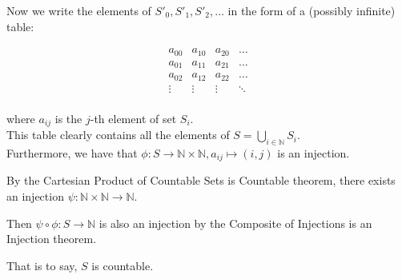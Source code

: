 \documentclass[12pt]{article}
\begin{document}
Now we write the elements of \( S'_0, S'_1, S'_2, \ldots \) in the form of a (possibly infinite) table:

\[
\begin{array}{cccccc}
a_{00} & a_{10} & a_{20} & \ldots \\
a_{01} & a_{11} & a_{21} & \ldots \\
a_{02} & a_{12} & a_{22} & \ldots \\
\vdots & \vdots & \vdots & \ddots \\
\end{array}
\]

where \( a_{ij} \) is the \( j \)-th element of set \( S_i \).\\

This table clearly contains all the elements of \( S = \bigcup_{i \in \mathbb{N}} S_i \).\\

Furthermore, we have that \( \phi: S \to \mathbb{N} \times \mathbb{N}, a_{ij} \mapsto (i, j) \) is an injection.

By the Cartesian Product of Countable Sets is Countable theorem, there exists an injection \( \psi: \mathbb{N} \times \mathbb{N} \to \mathbb{N} \).

Then \( \psi \circ \phi: S \to \mathbb{N} \) is also an injection by the Composite of Injections is an Injection theorem.

That is to say, \( S \) is countable.
\end{document}
